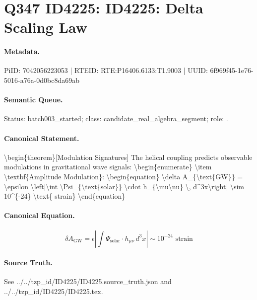 \section*{Q347 ID4225: ID4225: Delta Scaling Law}
\paragraph{Metadata.}
PiID: 7042056223053 | RTEID: RTE:P16406.6133:T1.9003 | UUID: 6f969f45-1e76-5016-a76a-0d0bc8da69ab

\paragraph{Semantic Queue.}
Status: batch003\_started; class: candidate\_real\_algebra\_segment; role: .

\paragraph{Canonical Statement.}
\textbackslash{}begin\{theorem\}[Modulation Signatures] The helical coupling predicts observable modulations in gravitational wave signals: \textbackslash{}begin\{enumerate\} \textbackslash{}item \textbackslash{}textbf\{Amplitude Modulation\}: \textbackslash{}begin\{equation\} \textbackslash{}delta A\_\{\textbackslash{}text\{GW\}\} = \textbackslash{}epsilon \textbackslash{}left|\textbackslash{}int \textbackslash{}Psi\_\{\textbackslash{}text\{solar\}\} \textbackslash{}cdot h\_\{\textbackslash{}mu\textbackslash{}nu\} \textbackslash{}, d\textasciicircum{}3x\textbackslash{}right| \textbackslash{}sim 10\textasciicircum{}\{-24\} \textbackslash{}text\{ strain\} \textbackslash{}end\{equation\}

\paragraph{Canonical Equation.}
\[
\begin{equation} \delta A_{\text{GW}} = \epsilon \left|\int \Psi_{\text{solar}} \cdot h_{\mu\nu} \, d^3x\right| \sim 10^{-24} \text{ strain} \end{equation}
\]

\paragraph{Source Truth.}
See ../../tzp\_id/ID4225/ID4225.source\_truth.json and ../../tzp\_id/ID4225/ID4225.tex.

